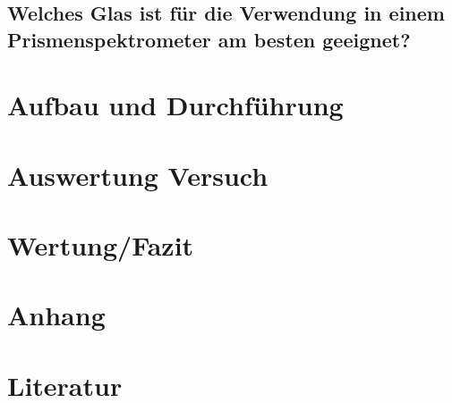 \documentclass[a4paper]{scrartcl}
\numberwithin{equation}{subsection}
\begin{document}
\subsection{Welches Glas ist für die Verwendung in einem Prismenspektrometer am besten geeignet?}

\newpage
\section{Aufbau und Durchführung}

\newpage
\section{Auswertung Versuch}

\newpage
\section{Wertung/Fazit}

\newpage
\section{Anhang}

\newpage
\section{Literatur}

\label{LastPage}
\end{document}
